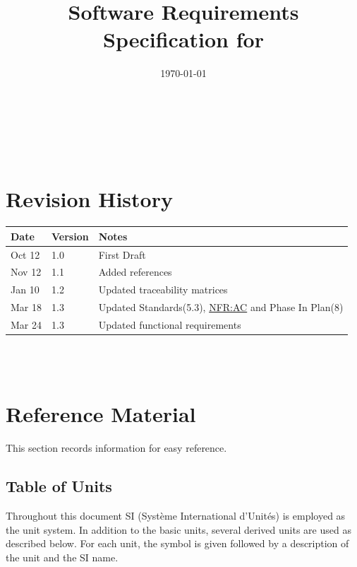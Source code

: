 \documentclass[12pt]{article}
\newcommand{\hpref}[1]{\hyperref[#1]{#1}}
\begin{document}
\title{Software Requirements Specification for \progname} 
\author{\authname}
\date{\today}
	
\maketitle

~\newpage


\tableofcontents

~\newpage

\section*{Revision History}

\begin{tabularx}{\textwidth}{p{3cm}p{2cm}X}
\toprule {\bf Date} & {\bf Version} & {\bf Notes}\\
\midrule
Oct 12 & 1.0 & First Draft\\
Nov 12 & 1.1 & Added references \\
Jan 10 & 1.2 & Updated traceability matrices \\
Mar 18 & 1.3 & Updated Standards(5.3), \hpref{NFR:AC} and Phase In Plan(8) \\
Mar 24 & 1.3 & Updated functional requirements \\
\bottomrule
\end{tabularx}

~\\

~\newpage

\section{Reference Material}

This section records information for easy reference.

\subsection{Table of Units}

Throughout this document SI (Syst\`{e}me International d'Unit\'{e}s) is employed
as the unit system.  In addition to the basic units, several derived units are
used as described below.  For each unit, the symbol is given followed by a
description of the unit and the SI name.
~\newline
\end{document}
